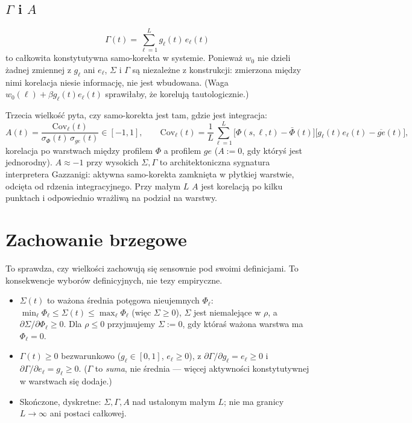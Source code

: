 \documentclass[11pt]{article}
\begin{document}
\subsection{$\Gamma$ i $A$}
\[
\Gamma(t) = \sum_{\ell=1}^{L} g_\ell(t)\,e_\ell(t)
\]
to całkowita konstytutywna samo-korekta w systemie. Ponieważ $w_0$ nie dzieli żadnej zmiennej z $g_\ell$ ani $e_\ell$, $\Sigma$ i $\Gamma$ są niezależne z konstrukcji: zmierzona między nimi korelacja niesie informację, nie jest wbudowana. (Waga $w_0(\ell)+\beta g_\ell(t)e_\ell(t)$ sprawiłaby, że korelują tautologicznie.)

Trzecia wielkość pyta, czy samo-korekta jest tam, gdzie jest integracja:
\[
A(t) = \frac{\mathrm{Cov}_\ell(t)}{\sigma_\Phi(t)\,\sigma_{ge}(t)} \in [-1,1], \qquad
\mathrm{Cov}_\ell(t) = \frac{1}{L}\sum_{\ell=1}^{L}\big[\Phi(s,\ell,t)-\bar\Phi(t)\big]\big[g_\ell(t)e_\ell(t)-\overline{ge}(t)\big],
\]
korelacja po warstwach między profilem $\Phi$ a profilem $ge$ ($A:=0$, gdy któryś jest jednorodny). $A\approx-1$ przy wysokich $\Sigma,\Gamma$ to architektoniczna sygnatura interpretera Gazzanigi: aktywna samo-korekta zamknięta w płytkiej warstwie, odcięta od rdzenia integracyjnego. Przy małym $L$ $A$ jest korelacją po kilku punktach i odpowiednio wrażliwą na podział na warstwy.

\section{Zachowanie brzegowe}\label{sec:bounds}

To sprawdza, czy wielkości zachowują się sensownie pod swoimi definicjami. To konsekwencje wyborów definicyjnych, nie tezy empiryczne.

\begin{itemize}[leftmargin=*]
\item $\Sigma(t)$ to ważona średnia potęgowa nieujemnych $\Phi_\ell$: $\min_\ell\Phi_\ell \le \Sigma(t) \le \max_\ell\Phi_\ell$ (więc $\Sigma\ge0$), $\Sigma$ jest niemalejące w $\rho$, a $\partial\Sigma/\partial\Phi_\ell\ge0$. Dla $\rho\le0$ przyjmujemy $\Sigma:=0$, gdy któraś ważona warstwa ma $\Phi_\ell=0$.
\item $\Gamma(t)\ge0$ bezwarunkowo ($g_\ell\in[0,1]$, $e_\ell\ge0$), z $\partial\Gamma/\partial g_\ell = e_\ell\ge0$ i $\partial\Gamma/\partial e_\ell = g_\ell\ge0$. ($\Gamma$ to \emph{suma}, nie średnia --- więcej aktywności konstytutywnej w warstwach się dodaje.)
\item Skończone, dyskretne: $\Sigma,\Gamma,A$ nad ustalonym małym $L$; nie ma granicy $L\to\infty$ ani postaci całkowej.
\end{itemize}
\end{document}
